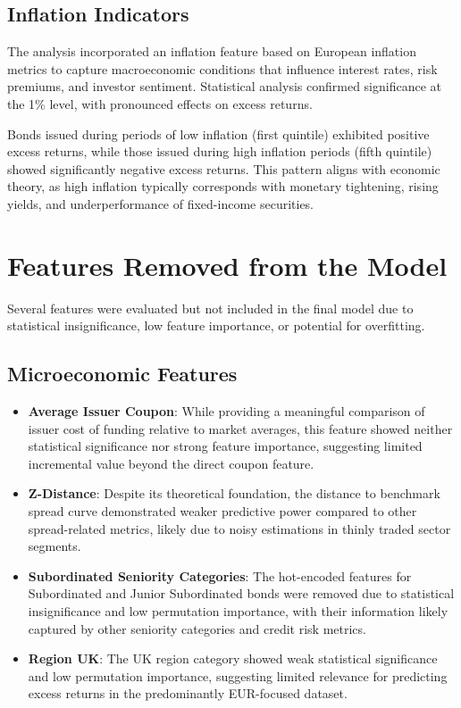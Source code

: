 \subsection{Inflation Indicators}

The analysis incorporated an inflation feature based on European inflation metrics to capture macroeconomic conditions that influence interest rates, risk premiums, and investor sentiment. Statistical analysis confirmed significance at the 1\% level, with pronounced effects on excess returns.

Bonds issued during periods of low inflation (first quintile) exhibited positive excess returns, while those issued during high inflation periods (fifth quintile) showed significantly negative excess returns. This pattern aligns with economic theory, as high inflation typically corresponds with monetary tightening, rising yields, and underperformance of fixed-income securities.

\section{Features Removed from the Model}

Several features were evaluated but not included in the final model due to statistical insignificance, low feature importance, or potential for overfitting.

\subsection{Microeconomic Features}

\begin{itemize}
    \item \textbf{Average Issuer Coupon}: While providing a meaningful comparison of issuer cost of funding relative to market averages, this feature showed neither statistical significance nor strong feature importance, suggesting limited incremental value beyond the direct coupon feature.
    \item \textbf{Z-Distance}: Despite its theoretical foundation, the distance to benchmark spread curve demonstrated weaker predictive power compared to other spread-related metrics, likely due to noisy estimations in thinly traded sector segments.
    \item \textbf{Subordinated Seniority Categories}: The hot-encoded features for Subordinated and Junior Subordinated bonds were removed due to statistical insignificance and low permutation importance, with their information likely captured by other seniority categories and credit risk metrics.
    \item \textbf{Region UK}: The UK region category showed weak statistical significance and low permutation importance, suggesting limited relevance for predicting excess returns in the predominantly EUR-focused dataset.
\end{itemize}

